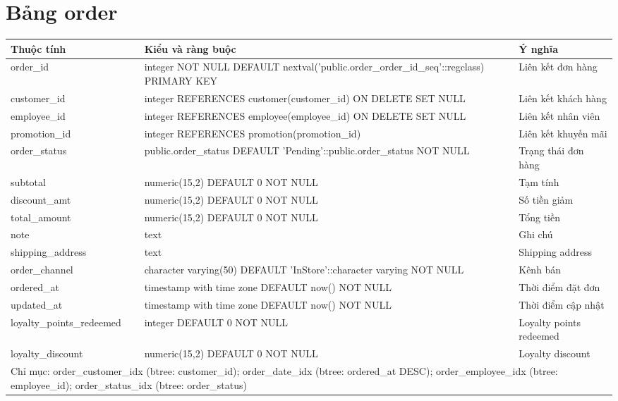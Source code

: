 \section{Bảng order}
\begin{longtable}{|p{}|p{}|p{}|}\hline
\textbf{Thuộc tính}&\textbf{Kiểu và ràng buộc}&\textbf{Ý nghĩa}\\\hline\endhead
order\_id & integer NOT NULL DEFAULT nextval('public.order\_order\_id\_seq'::regclass) PRIMARY KEY & Liên kết đơn hàng\\\hline
customer\_id & integer REFERENCES customer(customer\_id) ON DELETE SET NULL & Liên kết khách hàng\\\hline
employee\_id & integer REFERENCES employee(employee\_id) ON DELETE SET NULL & Liên kết nhân viên\\\hline
promotion\_id & integer REFERENCES promotion(promotion\_id) & Liên kết khuyến mãi\\\hline
order\_status & public.order\_status DEFAULT 'Pending'::public.order\_status NOT NULL & Trạng thái đơn hàng\\\hline
subtotal & numeric(15,2) DEFAULT 0 NOT NULL & Tạm tính\\\hline
discount\_amt & numeric(15,2) DEFAULT 0 NOT NULL & Số tiền giảm\\\hline
total\_amount & numeric(15,2) DEFAULT 0 NOT NULL & Tổng tiền\\\hline
note & text & Ghi chú\\\hline
shipping\_address & text & Shipping address\\\hline
order\_channel & character varying(50) DEFAULT 'InStore'::character varying NOT NULL & Kênh bán\\\hline
ordered\_at & timestamp with time zone DEFAULT now() NOT NULL & Thời điểm đặt đơn\\\hline
updated\_at & timestamp with time zone DEFAULT now() NOT NULL & Thời điểm cập nhật\\\hline
loyalty\_points\_redeemed & integer DEFAULT 0 NOT NULL & Loyalty points redeemed\\\hline
loyalty\_discount & numeric(15,2) DEFAULT 0 NOT NULL & Loyalty discount\\\hline
\multicolumn{3}{|p{0.93\textwidth}|}{Chỉ mục: order\_customer\_idx (btree: customer\_id); order\_date\_idx (btree: ordered\_at DESC); order\_employee\_idx (btree: employee\_id); order\_status\_idx (btree: order\_status)}\\\hline
\end{longtable}
\normalsize
